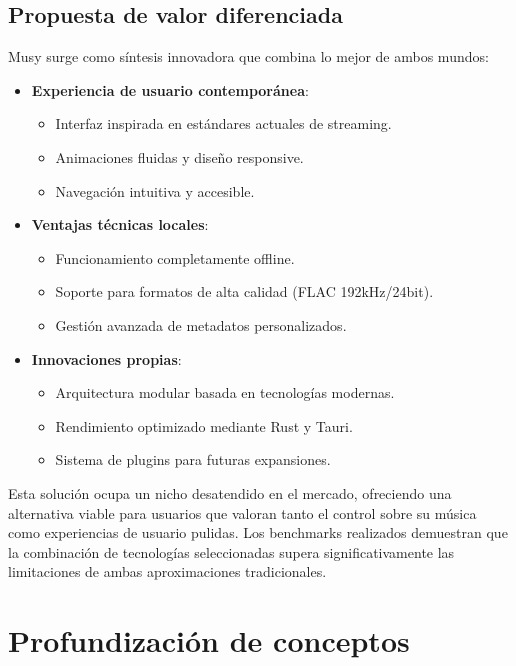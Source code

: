 \documentclass[11pt, a4paper]{article}
\begin{document}
\subsection{Propuesta de valor diferenciada}

Musy surge como síntesis innovadora que combina lo mejor de ambos mundos:

\begin{itemize}
    \item \textbf{Experiencia de usuario contemporánea}:
    \begin{itemize}
        \item Interfaz inspirada en estándares actuales de streaming.
        \item Animaciones fluidas y diseño responsive.
        \item Navegación intuitiva y accesible.
    \end{itemize}
    
    \item \textbf{Ventajas técnicas locales}:
    \begin{itemize}
        \item Funcionamiento completamente offline.
        \item Soporte para formatos de alta calidad (FLAC 192kHz/24bit).
        \item Gestión avanzada de metadatos personalizados.
    \end{itemize}
    
    \item \textbf{Innovaciones propias}:
    \begin{itemize}
        \item Arquitectura modular basada en tecnologías modernas.
        \item Rendimiento optimizado mediante Rust y Tauri.
        \item Sistema de plugins para futuras expansiones.
    \end{itemize}
\end{itemize}

Esta solución ocupa un nicho desatendido en el mercado, ofreciendo una alternativa viable para usuarios que valoran tanto el control sobre su música como experiencias de usuario pulidas. Los benchmarks realizados demuestran que la combinación de tecnologías seleccionadas supera significativamente las limitaciones de ambas aproximaciones tradicionales.

\section{Profundización de conceptos}
\end{document}
